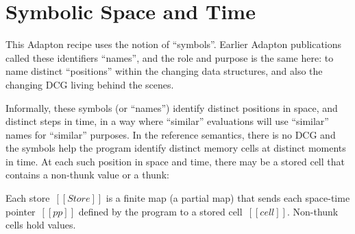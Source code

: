 \documentclass[11pt]{article}
\begin{document}


\section{Symbolic Space and Time}
\label{sec:symbolic-space-and-time}

This Adapton recipe uses the notion of ``symbols''.
%
Earlier Adapton publications called these identifiers ``names'', and
the role and purpose is the same here: to name distinct ``positions''
within the changing data structures, and also the changing DCG living
behind the scenes.

Informally, these symbols (or ``names'') identify distinct positions
in space, and distinct steps in time, in a way where ``similar''
evaluations will use ``similar'' names for ``similar'' purposes.
%
In the reference semantics, there is no DCG and the symbols help the
program identify distinct memory cells at distinct moments in time.
%
At each such position in space and time, there may be a stored cell
that contains a non-thunk value or a thunk:


\ottgrammartabular{\ottStore}
\ottgrammartabular{\ottcell}
\ottgrammartabular{\ottStoreValueOption}

Each store~$[[Store]]$ is a finite map (a partial map) that sends each space-time pointer~$[[pp]]$
defined by the program to a stored cell~$[[cell]]$.
%
Non-thunk cells hold values.
\end{document}
